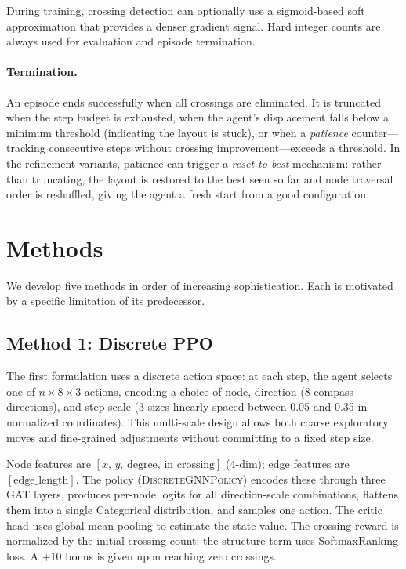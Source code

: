 \documentclass[10pt,twocolumn]{article}
\begin{document}
During training, crossing detection can optionally use a sigmoid-based soft
approximation that provides a denser gradient signal.  Hard integer counts
are always used for evaluation and episode termination.

\paragraph{Termination.}
An episode ends successfully when all crossings are eliminated.  It is
truncated when the step budget is exhausted, when the agent's displacement
falls below a minimum threshold (indicating the layout is stuck), or when
a \emph{patience} counter---tracking consecutive steps without crossing
improvement---exceeds a threshold.  In the refinement variants, patience
can trigger a \emph{reset-to-best} mechanism: rather than truncating, the
layout is restored to the best seen so far and node traversal order is
reshuffled, giving the agent a fresh start from a good configuration.

\section{Methods}
\label{sec:methods}

We develop five methods in order of increasing sophistication.  Each is
motivated by a specific limitation of its predecessor.

\subsection{Method 1: Discrete PPO}

The first formulation uses a discrete action space: at each step, the agent
selects one of $n \times 8 \times 3$ actions, encoding a choice of node,
direction (8 compass directions), and step scale (3 sizes linearly spaced
between 0.05 and 0.35 in normalized coordinates).  This multi-scale design
allows both coarse exploratory moves and fine-grained adjustments without
committing to a fixed step size.

Node features are $[x,\, y,\, \text{degree},\, \text{in\_crossing}]$ (4-dim);
edge features are $[\text{edge\_length}]$.
The policy (\textsc{DiscreteGNNPolicy}) encodes these through three GAT
layers, produces per-node logits for all direction-scale combinations,
flattens them into a single Categorical distribution, and samples one action.
The critic head uses global mean pooling to estimate the state value.
The crossing reward is normalized by the initial crossing count; the structure
term uses SoftmaxRanking loss.  A $+10$ bonus is given upon reaching zero
crossings.
\end{document}
